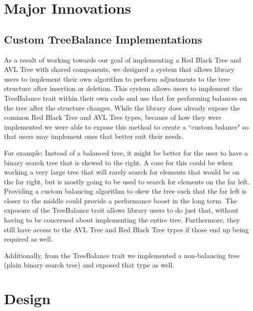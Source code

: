 \documentclass[11pt, letterpaper]{article}
\title{\textbf{\Huge{ 
\begin{center}
    Balanced Binary Tree Crate Report %
\end{center} 
}}}
\author{
    Mackenzie Malainey - \texttt{mmalaine@ualberta.ca} \\
    Lora Ma - \texttt{lora@ualberta.ca} \\
    Benjamin Kong - \texttt{bkong@ualberta.ca} \\\\
}
\begin{document}
\maketitle
\newpage
{
  \hypersetup{}
  \parskip 0pt
  \tableofcontents
} %

\section{Major Innovations}

\subsection{Custom TreeBalance Implementations}
As a result of working towards our goal of implementing a Red Black Tree and AVL Tree with shared components,
we designed a system that allows library users to implement their own algorithm to perform adjustments
to the tree structure after insertion or deletion.  This system allows users to implement the TreeBalance
trait within their own code and use that for performing balances on the tree after the structure changes.
While the library does already expose the common Red Black Tree and AVL Tree types, because of how they were implemented
we were able to expose this method to create a ``custom balance" so that users may implement ones that better suit their needs.

For example:
Instead of a balanced tree, it might be better for the user to have a binary search tree that is skewed to the right.
A case for this could be when working a very large tree that will rarely search for elements that would be on the far right,
but is mostly going to be used to search for elements on the far left.  Providing a custom balancing algorithm to skew the tree
such that the far left is closer to the middle could provide a performance boost in the long term.  The exposure of the
TreeBalance trait allows library users to do just that, without having to be concerned about implementing the entire tree.
Furthermore, they still have access to the AVL Tree and Red Black Tree types if those end up being required as well.

Additionally, from the TreeBalance trait we implemented a non-balancing tree (plain binary search tree) and exposed that type as well.

\newpage
\section{Design}
\end{document}
